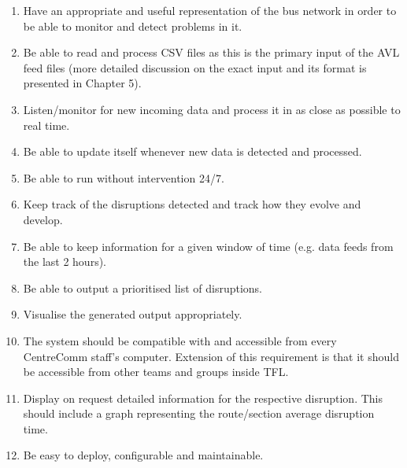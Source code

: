 \begin{enumerate}
	\item Have an appropriate and useful representation of the bus network in order to be able to monitor and detect problems in it.
	\item Be able to read and process CSV files as this is the primary input of the AVL feed files (more detailed discussion on the exact input and its format is presented in Chapter 5).
	\item Listen/monitor for new incoming data and process it in as close as possible to real time.
	\item Be able to update itself whenever new data is detected and processed.
	\item Be able to run without intervention 24/7.
	\item Keep track of the disruptions detected and track how they evolve and develop.
	\item Be able to keep information for a given window of time (e.g. data feeds from the last 2 hours).
	\item Be able to output a prioritised list of disruptions.
	\item Visualise the generated output appropriately.
	\item The system should be compatible with and accessible from every CentreComm staff's computer. Extension of this requirement is that it should be accessible from other teams and groups inside TFL.
	\item Display on request detailed information for the respective disruption. This should include a graph representing the route/section average disruption time.
	\item Be easy to deploy, configurable and maintainable.
\end{enumerate}